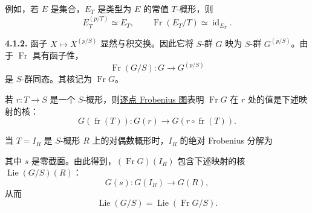 例如，若 \(E\) 是集合，\(E_T\) 是类型为 \(E\) 的常值 \(T\)-概形，则
\[
  E_T^{(p/T)}\simeq E_T,
  \qquad
  \operatorname{Fr}(E_T/T)\simeq\operatorname{id}_{E_T}.
\]

\medskip
\noindent\textbf{4.1.2.}
\label{sga3:VIIA:4.1.2}
函子 \(X\mapsto X^{(p/S)}\) 显然与积交换。因此它将 \(S\)-群 \(G\) 映为 \(S\)-群 \(G^{(p/S)}\)。由于 \(\operatorname{Fr}\) 具有函子性，
\[
  \operatorname{Fr}(G/S):G\longrightarrow G^{(p/S)}
\]
是 \(S\)-群同态。其核记为 \(\operatorname{Fr}G\)。

若 \(r:T\to S\) 是一个 \(S\)-概形，则\hyperref[sga3:VIIA:4.1-pointwise-frobenius-square]{逐点 Frobenius 图}表明 \(\operatorname{Fr}G\) 在 \(r\) 处的值是下述映射的核：
\[
  G(\operatorname{fr}(T)):
  G(r)\longrightarrow G(r\circ\operatorname{fr}(T)).
\]

当 \(T=I_R\) 是 \(S\)-概形 \(R\) 上的对偶数概形时，\(I_R\) 的绝对 Frobenius 分解为
\begin{center}
  \label{sga3:VIIA:4.1.2-dual-numbers-factorization}
  
\end{center}
其中 \(s\) 是零截面。由此得到，\((\operatorname{Fr}G)(I_R)\) 包含下述映射的核 \(\operatorname{Lie}(G/S)(R)\)：
\[
  G(s):G(I_R)\longrightarrow G(R),
\]
从而
\[
  \operatorname{Lie}(G/S)
  =
  \operatorname{Lie}(\operatorname{Fr}G/S).
\]

